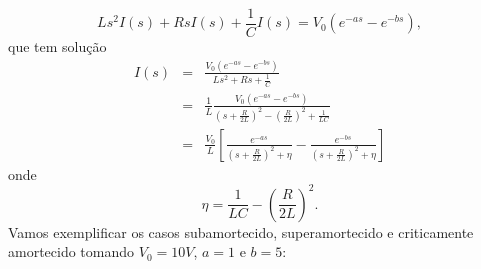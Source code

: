 \begin{equation*}
Ls^2I(s)+ RsI(s)+\frac{1}{C}I(s)=V_0\left(e^{-as}-e^{-bs}\right),
\end{equation*}
que tem solução
\begin{eqnarray*}
I(s)&=&\frac{V_0\left(e^{-as}-e^{-bs}\right)}{Ls^2+Rs+\frac{1}{C}}\\
&=&\frac{1}{L}\frac{V_0\left(e^{-as}-e^{-bs}\right)}{\left(s+\frac{R}{2L}\right)^2-\left(\frac{R}{2L}\right)^2+\frac{1}{LC}}\\
&=&\frac{V_0}{L}\left[\frac{e^{-as}}{\left(s+\frac{R}{2L}\right)^2+\eta}-\frac{e^{-bs}}{\left(s+\frac{R}{2L}\right)^2+\eta}\right]
\end{eqnarray*}
onde
\begin{equation}
\eta=\frac{1}{LC}-\left(\frac{R}{2L}\right)^2.
\end{equation}
Vamos exemplificar os casos subamortecido, superamortecido e criticamente amortecido tomando $V_0=10V$, $a=1$ e $b=5$:
